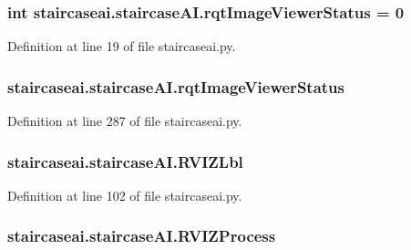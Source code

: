 \hypertarget{classstaircaseai_1_1staircaseAI_a1480f7f7d21ef55eac0d17876b33de1b}{
\subsubsection[{rqt\-Image\-Viewer\-Status}]{\setlength{\rightskip}{0pt plus 5cm}int staircaseai.\-staircase\-A\-I.\-rqt\-Image\-Viewer\-Status = 0\hspace{0.3cm}{\ttfamily [static]}}}\label{classstaircaseai_1_1staircaseAI_a1480f7f7d21ef55eac0d17876b33de1b}


Definition at line 19 of file staircaseai.\-py.

\hypertarget{classstaircaseai_1_1staircaseAI_a3bf21dbce86df4212e2a71d8449acfd3}{
\subsubsection[{rqt\-Image\-Viewer\-Status}]{\setlength{\rightskip}{0pt plus 5cm}staircaseai.\-staircase\-A\-I.\-rqt\-Image\-Viewer\-Status}}\label{classstaircaseai_1_1staircaseAI_a3bf21dbce86df4212e2a71d8449acfd3}


Definition at line 287 of file staircaseai.\-py.

\hypertarget{classstaircaseai_1_1staircaseAI_ae050ef3b610f1f90003f74c89c6562c2}{
\subsubsection[{R\-V\-I\-Z\-Lbl}]{\setlength{\rightskip}{0pt plus 5cm}staircaseai.\-staircase\-A\-I.\-R\-V\-I\-Z\-Lbl}}\label{classstaircaseai_1_1staircaseAI_ae050ef3b610f1f90003f74c89c6562c2}


Definition at line 102 of file staircaseai.\-py.

\hypertarget{classstaircaseai_1_1staircaseAI_a54bcc18605f2331eeb8d42a0709b3590}{
\subsubsection[{R\-V\-I\-Z\-Process}]{\setlength{\rightskip}{0pt plus 5cm}staircaseai.\-staircase\-A\-I.\-R\-V\-I\-Z\-Process}}\label{classstaircaseai_1_1staircaseAI_a54bcc18605f2331eeb8d42a0709b3590}


